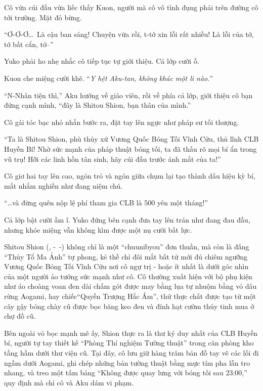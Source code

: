 \documentclass[../main.tex]{subfiles}
\begin{document}
\chrint

Cô vừa cúi đầu vừa liếc thấy Kuon, người mà cô vô tình đụng phải trên đường cô tới trường. Mặt đỏ bừng.

``Ơ-Ơ-Ơ\dots\ Là cậu ban sáng! Chuyện vừa rồi, t-tớ xin lỗi rất nhiều! Là lỗi của tớ, tớ bất cẩn, tớ--''

Yuko phải ho nhẹ nhắc cô tiếp tục tự giới thiệu. Cả lớp cười ồ.

Kuon che miệng cười khẽ. ``\textit{Y hệt Aku-tan, không khác một li nào.}''

``N-Nhân tiện thì,'' Aku hướng về giáo viên, rồi về phía cả lớp, giới thiệu cô bạn đứng cạnh mình, ``đây là Shitou Shion, bạn thân của mình.''

Cô gái tóc bạc nhỏ nhắn bước ra, đặt tay lên ngực như pháp sư tối thượng.

``Ta là Shitou Shion, phù thủy xứ Vương Quốc Bóng Tối Vĩnh Cửu, thủ lĩnh CLB Huyền Bí! Nhờ sức mạnh của pháp thuật bóng tối, ta đã thấu rõ mọi bí ẩn trong vũ trụ! Hỡi các linh hồn tân sinh, hãy cúi đầu trước ánh mắt của ta!''

Cô giơ hai tay lên cao, ngón trỏ và ngón giữa chụm lại tạo thành dấu hiệu kỳ bí, mắt nhắm nghiền như đang niệm chú.

``\dots và đừng quên nộp lệ phí tham gia CLB là 500 yên một tháng!''

Cả lớp bật cười ầm ĩ. Yuko đứng bên cạnh đưa tay lên trán như đang đau đầu, nhưng khóe miệng vẫn không kìm được một nụ cười bất lực.

\chrint

Shitou Shion (, -\ -) không chỉ là một ``chuunibyou'' đơn thuần, mà còn là đấng ``Thủy Tổ Ma Ảnh'' tự phong, kẻ thề chỉ đôi mắt bất tử mới đủ chiêm ngưỡng Vương Quốc Bóng Tối Vĩnh Cửu nơi cô ngự trị - hoặc ít nhất là dưới góc nhìn của một người ảo tưởng sức mạnh như cô. Cô thường xuất hiện với bộ phụ kiện như áo choàng voan đen dài chấm gót được may bằng lụa tự nhuộm bằng vỏ dâu rừng Aogami, hay chiếc``Quyền Trượng Hắc Ám'', thứ thực chất được tạo từ một cây gậy bóng chày cũ được bọc băng keo đen và đính hạt cườm thủy tinh mua ở chợ đồ cũ.

Bên ngoài vỏ bọc mạnh mẽ ấy, Shion thực ra là thư ký duy nhất của CLB Huyền bí, người tự tay thiết kế ``Phòng Thí nghiệm Tường thuật'' trong căn phòng kho tầng hầm dưới thư viện cũ.  Tại đây, cô lưu giữ hàng trăm bản đồ tay vẽ các lối đi ngầm dưới Aogami, ghi chép những bản tường thuật bằng mực tím pha lẫn tro nhang, và treo một tấm bảng ``Không được quay lưng với bóng tối sau 23:00,'' quy định mà chỉ cô và Aku dám vi phạm.
\end{document}
